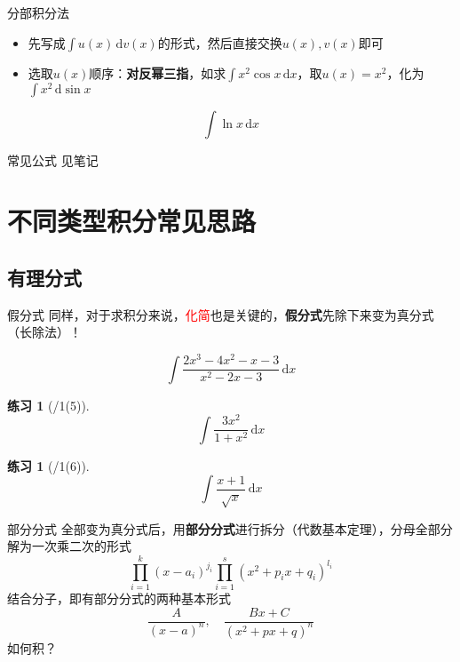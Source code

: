 \documentclass[UTF8]{ctexbeamer}
\def\diff{\,\mathrm{d}}
\newtheorem{exercise}[theorem]{练习} %
\begin{document}
\begin{frame}{分部积分法}
\begin{itemize}
	\item 先写成$\displaystyle\int u(x)\diff v(x)$的形式，然后直接交换$u(x),v(x)$即可
	\item 选取$u(x)$顺序：\textbf{对反幂三指}，如求$\displaystyle\int x^2\cos x\diff x$，取$u(x)=x^2$，化为$\displaystyle\int x^2\diff\sin x$
\end{itemize}
\begin{example}
\[\int\ln x\diff x\]
\end{example}
\end{frame}

\begin{frame}{常见公式}
见笔记
\end{frame}

\section{不同类型积分常见思路}
\begin{frame}
\sectionpage
\end{frame}

\subsection{有理分式}
\begin{frame}
\subsectionpage
\end{frame}

\begin{frame}{假分式}
同样，对于求积分来说，{\large\textcolor{red}{化简}}也是关键的，\textbf{假分式}先除下来变为真分式（长除法）！
\begin{example}
\[\int\frac{2x^3-4x^2-x-3}{x^2-2x-3}\diff x\]
\end{example}
\begin{exercise}[/1(5)]
\[\int\frac{3x^2}{1+x^2}\diff x\]
\end{exercise}
\begin{exercise}[/1(6)]
\[\int\frac{x+1}{\sqrt{x}}\diff x\]
\end{exercise}
\end{frame}

\begin{frame}{部分分式}
全部变为真分式后，用\textbf{部分分式}进行拆分（代数基本定理），分母全部分解为一次乘二次的形式
\[\prod_{i=1}^k(x-a_i)^{j_i}\prod_{i=1}^s(x^2+p_ix+q_i)^{l_i}\]
结合分子，即有部分分式的两种基本形式
\[\frac{A}{(x-a)^n},\quad\frac{Bx+C}{(x^2+px+q)^n}\]
如何积？
\end{frame}
\end{document}
